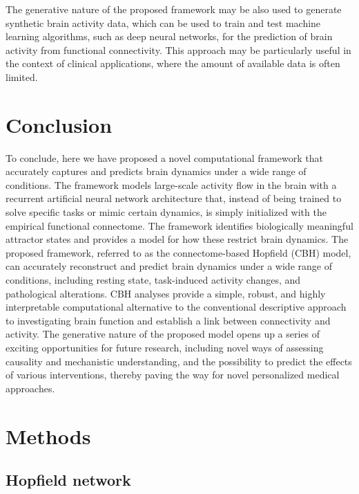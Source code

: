 \documentclass{article}
\begin{document}
The generative nature of the proposed framework may be also used to generate synthetic brain activity data, which can
be used to train and test machine learning algorithms, such as deep neural networks, for the prediction of brain
activity from functional connectivity. This approach may be particularly useful in the context of clinical applications,
where the amount of available data is often limited.

\section{Conclusion}\label{Conclusion}

To conclude, here we have proposed a novel computational framework that accurately captures and predicts brain dynamics
under a wide range of conditions. The framework models large-scale activity flow in the brain with a recurrent
artificial neural network architecture that, instead of being trained to solve specific tasks or mimic certain dynamics,
is simply initialized with the empirical functional connectome. The framework identifies biologically meaningful
attractor states and provides a model for how these restrict brain dynamics. The proposed framework, referred to as the
connectome-based Hopfield (CBH) model, can accurately reconstruct and predict brain dynamics under a wide range of
conditions, including resting state, task-induced activity changes, and pathological alterations. CBH analyses provide
a simple, robust, and highly interpretable computational alternative to the conventional descriptive approach to
investigating brain function and establish a link between connectivity and activity. The generative nature of the
proposed model opens up a series of exciting opportunities for future research, including novel ways of assessing
causality and mechanistic understanding, and the possibility to predict the effects of various interventions, thereby
paving the way for novel personalized medical approaches.

\section{Methods}\label{Methods}

\subsection{Hopfield network}\label{Hopfield network}
\end{document}
